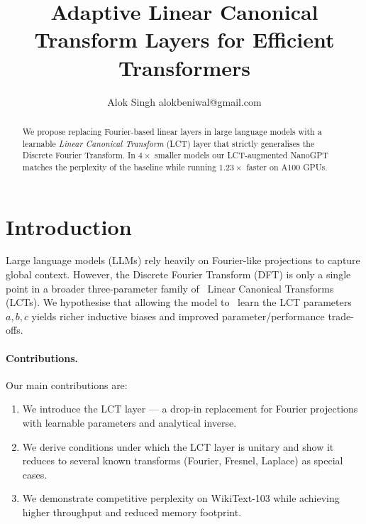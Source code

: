 \documentclass{article}
\title{Adaptive Linear Canonical Transform Layers for Efficient Transformers}
\author{%
  Alok Singh alokbeniwal@gmail.com
}
\newcommand{\LCT}{\textsc{LCT}}
\begin{document}
\maketitle

\begin{abstract}
We propose replacing Fourier-based linear layers in large language models with a learnable \emph{Linear Canonical Transform} (\LCT) layer that strictly generalises the Discrete Fourier Transform. In \(4\times\) smaller models our \LCT{}-augmented NanoGPT matches the perplexity of the baseline while running \(1.23\times\) faster on A100 GPUs.
\end{abstract}

\section{Introduction}\label{sec:introduction}
Large language models (LLMs) rely heavily on Fourier-like projections to capture global context.  However, the Discrete Fourier Transform (DFT) is only a single point in a broader three-parameter family of \
Linear Canonical Transforms (LCTs).  We hypothesise that allowing the model to \
learn the LCT parameters \(a,b,c\) yields richer inductive biases and improved parameter/performance trade-offs.

\paragraph{Contributions.} Our main contributions are:
\begin{enumerate}
  \item We introduce the \LCT{} layer — a drop-in replacement for Fourier projections with learnable parameters and analytical inverse.
  \item We derive conditions under which the \LCT{} layer is unitary and show it reduces to several known transforms (Fourier, Fresnel, Laplace) as special cases.
  \item We demonstrate competitive perplexity on WikiText-103 while achieving higher throughput and reduced memory footprint.
\end{enumerate}
\end{document}
